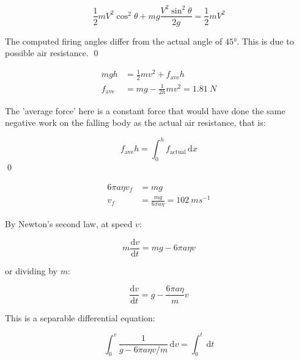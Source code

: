 \documentclass[12pt]{article}
\begin{document}

\begin{equation}
    \frac{1}{2} m V^{2} \cos^{2}{\theta} + m g \frac{V^{2} \sin^{2}{\theta}}{2g} = \frac{1}{2} m V^{2}
\end{equation}

The computed firing angles differ from the actual angle of $\ang{45}$. This is due to possible air resistance.
\qed



\begin{equation}
\begin{split}
    mgh &= \frac{1}{2} m v^{2} + f_{\text{ave}} h \\
    f_{\text{ave}} &= mg - \frac{1}{2h} m v^{2} = \qty{1.81}{N}
\end{split}
\end{equation}

The 'average force' here is a constant force that would have done the same negative work on the falling body as the actual air resistance, that is:

\begin{equation}
    f_{\text{ave}} h = \int_{0}^{h} f_{\text{actual}} \, \mathrm{d}x
\end{equation}
\qed




\begin{equation}
\begin{split}
    6\pi a \eta v_{f} &= mg \\
    v_{f} &= \frac{mg}{6\pi a \eta} = \qty{102}{ms^{-1}}
\end{split}
\end{equation}

By Newton's second law, at speed $v$:

\begin{equation}
    m \frac{\mathrm{d}v}{\mathrm{d}t} = mg - 6\pi a \eta v
\end{equation}

or dividing by $m$:

\begin{equation}
    \frac{\mathrm{d}v}{\mathrm{d}t} = g - \frac{6\pi a \eta}{m} v
\end{equation}

This is a separable differential equation:

\begin{equation}
    \int_{0}^{v} \frac{1}{g - 6\pi a \eta v/m} \, \mathrm{d}v = \int_{0}^{t} \, \mathrm{d}t
\end{equation}
\end{document}
